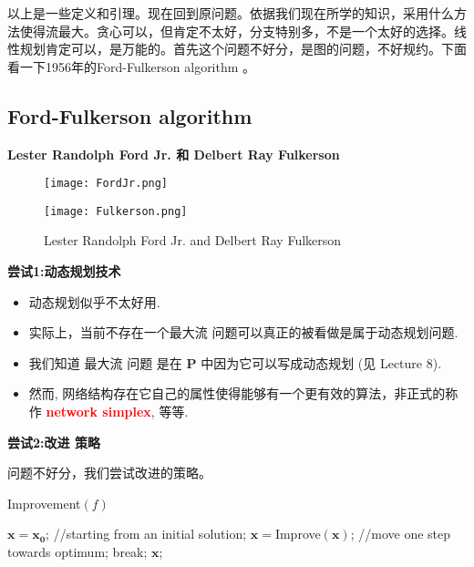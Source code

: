 \documentclass[11pt]{article}
\begin{document}
\begin{CJK}{UTF8}{gbsn}
以上是一些定义和引理。现在回到原问题。依据我们现在所学的知识，采用什么方法使得流最大。贪心可以，但肯定不太好，分支特别多，不是一个太好的选择。线性规划肯定可以，是万能的。首先这个问题不好分，是图的问题，不好规约。下面看一下1956年的Ford-Fulkerson algorithm 。

\subsection{Ford-Fulkerson algorithm}

\textbf{Lester Randolph Ford Jr. 和 Delbert Ray Fulkerson}

 \begin{figure}[H]%
   \begin{center}%
     \begin{minipage}{0.40\textwidth}%
      \texttt{[image: FordJr.png]}%
     \end{minipage}%
     \qquad
     \begin{minipage}{0.40\textwidth}
      \texttt{[image: Fulkerson.png]}%
     \end{minipage}%
   \end{center}
   \caption{ Lester Randolph Ford Jr. and Delbert Ray Fulkerson}
 \end{figure}

\textbf{尝试1:动态规划技术}

\begin{itemize}
\item
动态规划似乎不太好用.
\item
实际上，当前不存在一个{\sc 最大流} 问题可以真正的被看做是属于动态规划问题.
 \item
我们知道 {\sc 最大流} 问题 是在 $\mathbf{P}$ 中因为它可以写成动态规划 (见 Lecture 8).
\item
然而, 网络结构存在它自己的属性使得能够有一个更有效的算法，非正式的称作 \textcolor{red}{\bf network simplex}, 等等.
\end{itemize}

\textbf{尝试2:{\sc 改进} 策略}

问题不好分，我们尝试改进的策略。


{\sc Improvement}$(f)$
\begin{algorithmic}[1]
\STATE $\mathbf{x=x_0}$; //starting from an initial solution;
\STATE $\mathbf{x}=${\sc Improve}$(\mathbf{x})$; //move one step towards optimum;
\STATE break;
\ENDIF
\ENDWHILE
\RETURN $\mathbf{x}$;
\end{algorithmic}



\end{CJK}
\end{document}
